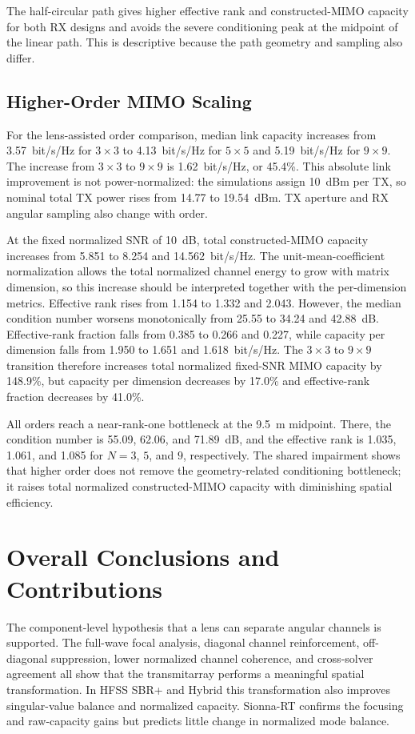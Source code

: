 The half-circular path gives higher effective rank and constructed-MIMO capacity for both RX designs and avoids the severe conditioning peak at the midpoint of the linear path. This is descriptive because the path geometry and sampling also differ.

\subsection{Higher-Order MIMO Scaling}

For the lens-assisted order comparison, median link capacity increases from 3.57~bit/s/Hz for $3\times3$ to 4.13~bit/s/Hz for $5\times5$ and 5.19~bit/s/Hz for $9\times9$. The increase from $3\times3$ to $9\times9$ is 1.62~bit/s/Hz, or 45.4\%. This absolute link improvement is not power-normalized: the simulations assign 10~dBm per TX, so nominal total TX power rises from 14.77 to 19.54~dBm. TX aperture and RX angular sampling also change with order.

At the fixed normalized SNR of 10~dB, total constructed-MIMO capacity increases from 5.851 to 8.254 and 14.562~bit/s/Hz. The unit-mean-coefficient normalization allows the total normalized channel energy to grow with matrix dimension, so this increase should be interpreted together with the per-dimension metrics. Effective rank rises from 1.154 to 1.332 and 2.043. However, the median condition number worsens monotonically from 25.55 to 34.24 and 42.88~dB. Effective-rank fraction falls from 0.385 to 0.266 and 0.227, while capacity per dimension falls from 1.950 to 1.651 and 1.618~bit/s/Hz. The $3\times3$ to $9\times9$ transition therefore increases total normalized fixed-SNR MIMO capacity by 148.9\%, but capacity per dimension decreases by 17.0\% and effective-rank fraction decreases by 41.0\%.

All orders reach a near-rank-one bottleneck at the 9.5~m midpoint. There, the condition number is 55.09, 62.06, and 71.89~dB, and the effective rank is 1.035, 1.061, and 1.085 for $N=3$, $5$, and $9$, respectively. The shared impairment shows that higher order does not remove the geometry-related conditioning bottleneck; it raises total normalized constructed-MIMO capacity with diminishing spatial efficiency.

\section{Overall Conclusions and Contributions}

The component-level hypothesis that a lens can separate angular channels is supported. The full-wave focal analysis, diagonal channel reinforcement, off-diagonal suppression, lower normalized channel coherence, and cross-solver agreement all show that the transmitarray performs a meaningful spatial transformation. In HFSS SBR+ and Hybrid this transformation also improves singular-value balance and normalized capacity. Sionna-RT confirms the focusing and raw-capacity gains but predicts little change in normalized mode balance.

